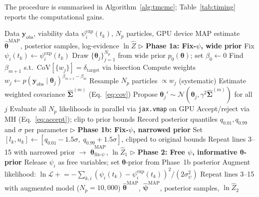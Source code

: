 \documentclass[11pt,a4paper]{article}
\newcommand{\btheta}{\boldsymbol{\theta}}
\newcommand{\bpsi}{\boldsymbol{\psi}}
\newcommand{\yobs}{\mathbf{y}_{\mathrm{obs}}}
\begin{document}
The procedure is summarised in Algorithm~\ref{alg:tmcmc}; Table~\ref{tab:timing} reports the computational gains.

\begin{algorithm}[t]
\caption{Two-phase GPU-accelerated TMCMC}
\label{alg:tmcmc}
\begin{algorithmic}[1]
\REQUIRE Data $\yobs$, viability data $\psi_i^{\mathrm{exp}}(t_k)$, $N_p$ particles, GPU device
\ENSURE MAP estimate $\hat{\btheta}^{\mathrm{MAP}}$, posterior samples, log-evidence $\ln\hat{Z}$
\STATE $\triangleright$ \textbf{Phase 1a: Fix-$\psi$, wide prior}
\STATE Fix $\psi_i(t_k) \leftarrow \psi_i^{\mathrm{exp}}(t_k)$
\STATE Draw $\{\btheta_j\}_{j=1}^{N_p}$ from wide prior $p_0(\btheta)$; set $\beta_0\leftarrow 0$
    \STATE Find $\beta_{m+1}$ s.t.\ $\mathrm{CoV}[\{w_j\}]=\delta_{\mathrm{target}}$ via bisection
    \STATE Compute weights $w_j \leftarrow p(\yobs\mid\btheta_j)^{\beta_{m+1}-\beta_m}$
    \STATE Resample $N_p$ particles $\propto w_j$ (systematic)
    \STATE Estimate weighted covariance $\hat{\boldsymbol{\Sigma}}^{(m)}$ (Eq.~\ref{eq:cov})
        \STATE Propose $\btheta_{j}' \sim \mathcal{N}(\btheta_j, \gamma^2 \hat{\boldsymbol{\Sigma}}^{(m)})$ for all $j$
        \STATE Evaluate all $N_p$ likelihoods in parallel via \texttt{jax.vmap} on GPU
        \STATE Accept/reject via MH (Eq.~\ref{eq:accept}); clip to prior bounds
    \ENDFOR
\ENDWHILE
\STATE Record posterior quantiles $q_{0.01},q_{0.99}$ and $\sigma$ per parameter
\STATE $\triangleright$ \textbf{Phase 1b: Fix-$\psi$, narrowed prior}
\STATE Set $[l_k,u_k] \leftarrow [q_{0.01}-1.5\sigma,\;q_{0.99}+1.5\sigma]$, clipped to original bounds
\STATE Repeat lines 3--15 with narrowed prior $\to$ $\hat{\btheta}^{\mathrm{MAP}}_{\text{fix-}\psi}$, $\ln\hat{Z}_1$
\STATE $\triangleright$ \textbf{Phase 2: Free $\psi$, informative $\btheta$-prior}
\STATE Release $\psi_i$ as free variables; set $\btheta$-prior from Phase~1b posterior
\STATE Augment likelihood: $\ln\mathcal{L} \mathrel{+}= -\sum_{k,i}(\psi_i(t_k)-\psi_i^{\mathrm{exp}}(t_k))^2/(2\sigma_\psi^2)$
\STATE Repeat lines 3--15 with augmented model ($N_p=10{,}000$)
\RETURN $\hat{\btheta}^{\mathrm{MAP}}$, $\hat{\bpsi}^{\mathrm{MAP}}$, posterior samples, $\ln\hat{Z}_2$
\end{algorithmic}
\end{algorithm}
\end{document}
